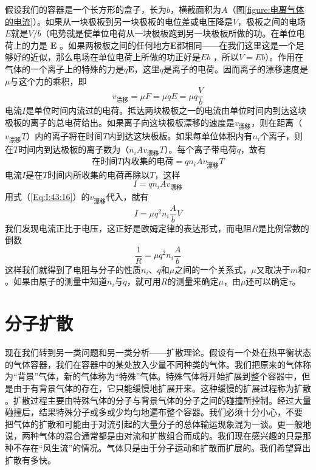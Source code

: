 假设我们的容器是一个长方形的盒子，长为$b$，横截面积为$A$（图\ref{figure:电离气体的电流}）。如果从一块极板到另一块极板的电位差或电压降是$V$，极板之间的电场$E$就是$V /b$（电势就是使单位电荷从一块极板跑到另一块极板所做的功。在单位电荷上的力是 $\boldsymbol{E}$ 。如果两极板之间的任何地方$\boldsymbol{E}$都相同——在我们这里这是一个足够好的近似，那么电场在单位电荷上所做的功正好是$Eb$ ，所以$V=Eb$）。作用在气体的一个离子上的特殊的力是$q\boldsymbol{E}$，这里$q$是离子的电荷。因而离子的漂移速度是$\mu$与这个力的乘积，即
\begin{equation}
    \label{Eq:I:43:16}
    v_\text{漂移}=\mu F = \mu qE = \mu q \frac{V}{b}
\end{equation}
电流$I$是单位时间内流过的电荷。抵达两块极板之一的电流由单位时间内到达这块极板的离子的总电荷给出。如果离子向这块极板漂移的速度是$v_\text{漂移}$，则在距离（$v_\text{漂移} T$）内的离子将在时间$T$内到达这块极板。如果每单位体积内有$n_i$个离子，则在$T$时间内到达极板的离子数为（$n_i Av_\text{漂移}T$）。每个离子带电荷$q$，故有
\begin{equation}
    \label{Eq:I:43:17}
    \text{在时间$T$内收集的电荷} = qn_iAv_\text{漂移}T
\end{equation}
电流$I$是在$T$时间内所收集的电荷再除以$T$，这样
\begin{equation}
    \label{Eq:I:43:18}
    I = qn_iAv_\text{漂移}
\end{equation}
用式（\ref{Eq:I:43:16}）的$v_\text{漂移}$代入，就有
\begin{equation}
    \label{Eq:I:43:19}
    I = \mu q^2n_i\frac{A}{b}V
\end{equation}
我们发现电流正比于电压，这正好是欧姆定律的表达形式，而电阻$R$是比例常数的倒数
\begin{equation}
    \label{Eq:I:43:20}
    \frac{1}{R} = \mu q^2n_i\frac{A}{b}
\end{equation}
这样我们就得到了电阻与分子的性质$n_i$、$q$和$\mu$之间的一个关系式，$\mu$又取决于$m$和$\tau$。如果由原子的测量中知道$n_i$与$q$，就可用$R$的测量来确定$\mu$，由$\mu$还可以确定$\tau$。

\section{分子扩散}

现在我们转到另一类问题和另一类分析——扩散理论。假设有一个处在热平衡状态的气体容器，我们在容器中的某处放入少量不同种类的气体。我们把原来的气体称为“背景”气体，新的气体称为“特殊”气体。特殊气体将开始扩展到整个容器中，但是由于有背景气体的存在，它只能缓慢地扩展开来。这种缓慢的扩展过程称为扩散 。扩散过程主要由特殊气体的分子与背景气体的分子之间的碰撞所控制。经过大量碰撞后，结果特殊分子或多或少均匀地遍布整个容器。我们必须十分小心，不要 把气体的扩散和可能由于对流引起的大量分子的总体输运现象混为一谈。更一般地说，两种气体的混合通常都是由对流和扩散组合而成的。我们现在感兴趣的只是那种不存在“风生流”的情况。气体只是由于分子运动和扩散而扩展的。我们希望算出扩散有多快。

